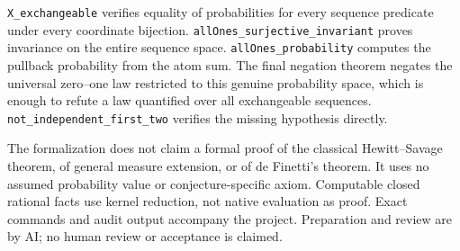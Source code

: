 \documentclass[11pt]{article}
\begin{document}
\texttt{X\_exchangeable} verifies equality of probabilities for every sequence predicate under every coordinate bijection. \texttt{allOnes\_surjective\_invariant} proves invariance on the entire sequence space. \texttt{allOnes\_probability} computes the pullback probability from the atom sum. The final negation theorem negates the universal zero--one law restricted to this genuine probability space, which is enough to refute a law quantified over all exchangeable sequences. \texttt{not\_independent\_first\_two} verifies the missing hypothesis directly.

The formalization does not claim a formal proof of the classical Hewitt--Savage theorem, of general measure extension, or of de Finetti's theorem. It uses no assumed probability value or conjecture-specific axiom. Computable closed rational facts use kernel reduction, not native evaluation as proof. Exact commands and audit output accompany the project. Preparation and review are by AI; no human review or acceptance is claimed.
\end{document}
